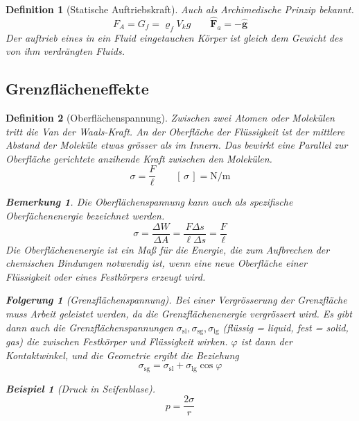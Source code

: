 \documentclass[a4paper, twocolumn]{article}
\numberwithin{equation}{section}
\theoremstyle{hsr-def}
\newtheorem{definition}{Definition}[section]
\theoremstyle{hsr-sub}
\newtheorem{result}{Folgerung}[definition]
\newtheorem{example}{Beispiel}[definition]
\newtheorem{remark}{Bemerkung}[definition]
\renewcommand{\vec}[1]{\ensuremath{\mathbf{#1}}}
\newcommand{\uvec}[1]{\ensuremath{\vec{\hat{#1}}}}
\newcommand{\unitsof}[1]{\ensuremath{\left[\,#1\,\right]}}
\begin{document}
\begin{definition}[Statische Auftriebskraft] Auch als Archimedische Prinzip bekannt.
\[
    F_A = G_f = \varrho_f  V_k g
    \qquad
    \uvec{F}_a = - \uvec{g}
\]
Der auftrieb eines in ein Fluid eingetauchen K\"orper ist gleich dem Gewicht des von ihm verdr\"angten Fluids.
\end{definition}

\subsection{Grenzfl\"acheneffekte}

\begin{definition}[Oberfl\"achenspannung]
Zwischen zwei Atomen oder Molek\"ulen tritt die \emph{Van der Waals}-Kraft.
An der Oberfl\"ache der Fl\"ussigkeit ist der mittlere Abstand der Molek\"ule etwas gr\"osser als im Innern. Das bewirkt eine Parallel zur Oberfl\"ache gerichtete anzihende Kraft zwischen den Molek\"ulen.
\[
    \sigma = \frac{F}{\ell}
    \qquad
    \unitsof{\sigma} = \si{\newton\per\metre}
\]
\begin{remark}
Die Oberfl\"achenspannung kann auch als \emph{spezifische Oberf\"achenenergie} bezeichnet werden.
\[
    \sigma
    = \frac{\Delta W}{\Delta A} 
    = \frac{F\Delta s}{\ell \Delta s}
    = \frac{F}{\ell}
\]
Die \emph{Oberfl\"achenenergie} ist ein Ma{\ss} f\"ur die Energie, die zum Aufbrechen der chemischen Bindungen notwendig ist, wenn eine neue Oberfl\"ache einer Fl\"ussigkeit oder eines Festkörpers erzeugt wird.
\end{remark}

\begin{result}[Grenzfl\"achenspannung]
Bei einer Vergr\"osserung der Grenzfl\"ache muss Arbeit geleistet werden, da die Grenzfl\"achenenergie vergr\"ossert wird.
Es gibt dann auch die Grenzfl\"achenspannungen 
\(
    \sigma_\text{sl},
    \sigma_\text{sg},
    \sigma_\text{lg}
\) (fl\"ussig = liquid, fest = solid, gas) die zwischen Festk\"orper und Fl\"ussigkeit wirken. \(\varphi\) ist dann der \emph{Kontaktwinkel}, und die Geometrie ergibt die Beziehung
\[
    \sigma_\text{sg} = \sigma_\text{sl} + \sigma_\text{lg} \cos \varphi
\]
\end{result}

\begin{example}[Druck in Seifenblase]
\[
    p = \frac{2\sigma}{r}
\]
\end{example}
\end{definition}
\end{document}
